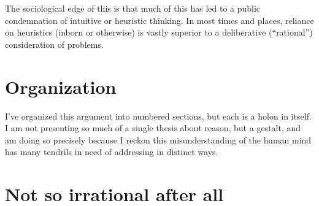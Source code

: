 \documentclass{article}
\begin{document}
The sociological edge of this is that much of this has led to a public condemnation of intuitive or heuristic thinking.
In most times and places, reliance on heuristics (inborn or otherwise) is vastly superior to a deliberative (``rational'') consideration of problems.






\section{Organization}

I've organized this argument into numbered sections, but each is a holon in itself.
I am not presenting so much of a single thesis about reason, but a gestalt, and am doing so precisely because I reckon this misunderstanding of the human mind has many tendrils in need of addressing in distinct ways.


\section{Not so irrational after all}
\end{document}
